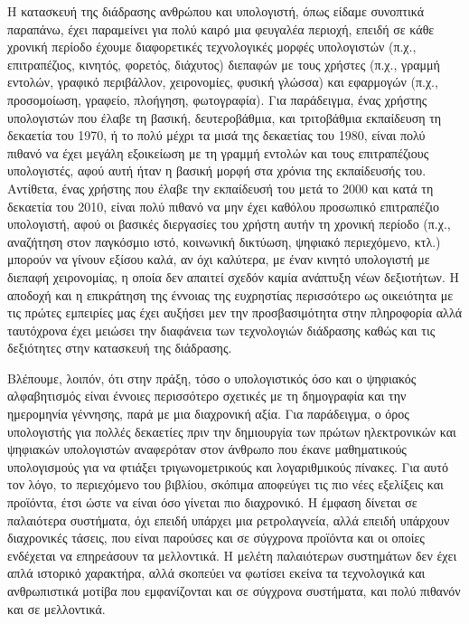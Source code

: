\documentclass[
]{article}
\begin{document}
Η κατασκευή της διάδρασης ανθρώπου και υπολογιστή, όπως είδαμε συνοπτικά
παραπάνω, έχει παραμείνει για πολύ καιρό μια φευγαλέα περιοχή, επειδή σε
κάθε χρονική περίοδο έχουμε διαφορετικές τεχνολογικές μορφές υπολογιστών
(π.χ., επιτραπέζιος, κινητός, φορετός, διάχυτος) διεπαφών με τους
χρήστες (π.χ., γραμμή εντολών, γραφικό περιβάλλον, χειρονομίες, φυσική
γλώσσα) και εφαρμογών (π.χ., προσομοίωση, γραφείο, πλοήγηση,
φωτογραφία). Για παράδειγμα, ένας χρήστης υπολογιστών που έλαβε τη
βασική, δευτεροβάθμια, και τριτοβάθμια εκπαίδευση τη δεκαετία του 1970,
ή το πολύ μέχρι τα μισά της δεκαετίας του 1980, είναι πολύ πιθανό να
έχει μεγάλη εξοικείωση με τη γραμμή εντολών και τους επιτραπέζιους
υπολογιστές, αφού αυτή ήταν η βασική μορφή στα χρόνια της εκπαίδευσής
του. Αντίθετα, ένας χρήστης που έλαβε την εκπαίδευσή του μετά το 2000
και κατά τη δεκαετία του 2010, είναι πολύ πιθανό να μην έχει καθόλου
προσωπικό επιτραπέζιο υπολογιστή, αφού οι βασικές διεργασίες του χρήστη
αυτήν τη χρονική περίοδο (π.χ., αναζήτηση στον παγκόσμιο ιστό, κοινωνική
δικτύωση, ψηφιακό περιεχόμενο, κτλ.) μπορούν να γίνουν εξίσου καλά, αν
όχι καλύτερα, με έναν κινητό υπολογιστή με διεπαφή χειρονομίας, η οποία
δεν απαιτεί σχεδόν καμία ανάπτυξη νέων δεξιοτήτων. Η αποδοχή και η
επικράτηση της έννοιας της ευχρηστίας περισσότερο ως οικειότητα με τις
πρώτες εμπειρίες μας έχει αυξήσει μεν την προσβασιμότητα στην πληροφορία
αλλά ταυτόχρονα έχει μειώσει την διαφάνεια των τεχνολογιών διάδρασης
καθώς και τις δεξιότητες στην κατασκευή της διάδρασης.

Βλέπουμε, λοιπόν, ότι στην πράξη, τόσο ο υπολογιστικός όσο και ο
ψηφιακός αλφαβητισμός είναι έννοιες περισσότερο σχετικές με τη
δημογραφία και την ημερομηνία γέννησης, παρά με μια διαχρονική αξία. Για
παράδειγμα, ο όρος υπολογιστής για πολλές δεκαετίες πριν την δημιουργία
των πρώτων ηλεκτρονικών και ψηφιακών υπολογιστών αναφερόταν στον άνθρωπο
που έκανε μαθηματικούς υπολογισμούς για να φτιάξει τριγωνομετρικούς και
λογαριθμικούς πίνακες. Για αυτό τον λόγο, το περιεχόμενο του βιβλίου,
σκόπιμα αποφεύγει τις πιο νέες εξελίξεις και προϊόντα, έτσι ώστε να
είναι όσο γίνεται πιο διαχρονικό. Η έμφαση δίνεται σε παλαιότερα
συστήματα, όχι επειδή υπάρχει μια ρετρολαγνεία, αλλά επειδή υπάρχουν
διαχρονικές τάσεις, που είναι παρούσες και σε σύγχρονα προϊόντα και οι
οποίες ενδέχεται να επηρεάσουν τα μελλοντικά. Η μελέτη παλαιότερων
συστημάτων δεν έχει απλά ιστορικό χαρακτήρα, αλλά σκοπεύει να φωτίσει
εκείνα τα τεχνολογικά και ανθρωπιστικά μοτίβα που εμφανίζονται και σε
σύγχρονα συστήματα, και πολύ πιθανόν και σε μελλοντικά.
\end{document}
